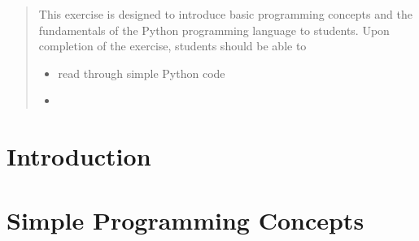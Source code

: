 \maketitle

\begin{abstract}
  \noindent
  This exercise is designed to introduce basic programming concepts and the
  fundamentals of the Python programming language to students.
  Upon completion of the exercise, students should be able to
  \begin{itemize}
    \item read through simple Python code
    \item
  \end{itemize}
\end{abstract}

\section{Introduction} %
\label{sec:intro}



\section{Simple Programming Concepts} %
\label{sec:simple_programming_concepts}

